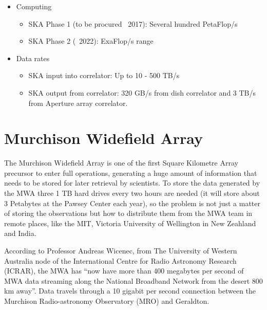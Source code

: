 \begin{itemize}


\item Computing

\begin{itemize}
\item SKA Phase 1 (to be procured ~2017): Several hundred PetaFlop/s
\item SKA Phase 2 (~2022): ExaFlop/s range
\end{itemize}


\item Data rates

\begin{itemize}
\item SKA input into correlator: Up to 10 - 500 TB/s
\item SKA output from correlator: 320 GB/s from dish correlator and 3 TB/s from Aperture array correlator.
\end{itemize}

\end{itemize}





\section{Murchison Widefield Array} %
\label{sec:murchison_widefield_array}

The Murchison Widefield Array is
one of %
the first Square Kilometre Array precursor to enter full operations, generating a huge amount of information that needs to be stored for later retrieval by scientists. To store the data generated by the MWA three 1 TB hard drives every two hours are needed (it will store about 3 Petabytes at the Pawsey Center each year), so the
problem is not %
just a matter of storing the observations but how to distribute them from the MWA team in remote places, like
the MIT, %
Victoria University of Wellington in New Zeahland and India. 

According to Professor Andreas Wicenec, from The University of Western Australia node of the International Centre for Radio Astronomy Research (ICRAR),
the MWA %
has ``now have more than 400 megabytes per second of MWA data streaming along the National Broadband Network from the desert 800 km away''. Data travels through a 10 gigabit per second connection between the Murchison Radio-astronomy Observatory (MRO) and
Geraldton.

